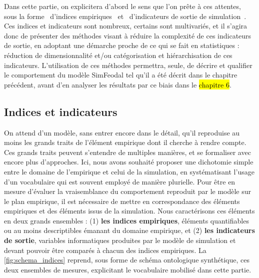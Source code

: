 Dans cette partie, on explicitera d'abord le sens que l'on prête à ces attentes, sous la forme \og d'indices empiriques \fg{} et \og d'indicateurs de sortie de simulation \fg{}.
Ces indices et indicateurs sont nombreux, certains sont multivariés, et il s'agira donc de présenter des méthodes visant à réduire la complexité de ces indicateurs de sortie, en adoptant une démarche proche de ce qui se fait en statistiques : réduction de dimensionnalité et/ou catégorisation et hiérarchisation de ces indicateurs.
L'utilisation de ces méthodes permettra, seule, de décrire et qualifier le comportement du modèle SimFeodal tel qu'il a été décrit dans le chapitre précédent, avant d'en analyser les résultats par ce biais dans le \hl{chapitre 6}.

\subsection{Indices et indicateurs}\label{subsec:indices-indicateurs}

On attend d'un modèle, sans entrer encore dans le détail, qu'il reproduise au moins les grands traits de l'élément empirique dont il cherche à rendre compte.
Ces grands traits peuvent s'entendre de multiples manières, et se formaliser avec encore plus d'approches.
Ici, nous avons souhaité proposer une dichotomie simple entre le domaine de l'empirique et celui de la simulation, en systématisant l'usage d'un vocabulaire qui est souvent employé de manière plurielle.
Pour être en mesure d'évaluer la vraisemblance du comportement reproduit par le modèle sur le plan empirique, il est nécessaire de mettre en correspondance des éléments empiriques et des éléments issus de la simulation.
Nous caractérisons ces éléments en deux grands ensembles :
(1) \textbf{les indices empiriques}, éléments quantifiables ou au moins descriptibles émanant du domaine empirique, et (2) \textbf{les indicateurs de sortie}, variables informatiques produites par le modèle de simulation et devant pouvoir être comparés à chacun des indices empiriques.
La \cref{fig:schema_indices} reprend, sous forme de schéma ontologique synthétique, ces deux ensembles de mesures, explicitant le vocabulaire mobilisé dans cette partie.

